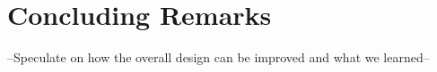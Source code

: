 \section*{Concluding Remarks}
--Speculate on how the overall design can be improved and what we learned--
